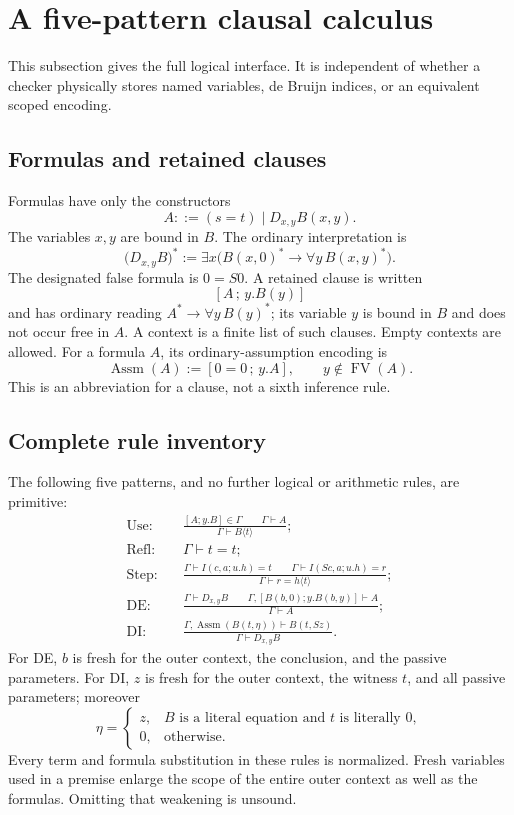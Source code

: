 \documentclass[11pt,letterpaper]{article}
\theoremstyle{definition}
\begin{document}
\section{A five-pattern clausal calculus}
\label{sec:five-pattern-clauses}

This subsection gives the full logical interface. It is independent of
whether a checker physically stores named variables, de Bruijn indices,
or an equivalent scoped encoding.

\subsection{Formulas and retained clauses}

Formulas have only the constructors
\[
 A ::= (s=t)\mid D_{x,y}B(x,y).
\]
The variables $x,y$ are bound in $B$. The ordinary interpretation is
\[
 \bigl(D_{x,y}B\bigr)^*
 :=\exists x\bigl(B(x,0)^*\to\forall y\,B(x,y)^*\bigr).
\]
The designated false formula is $0=S0$.
A retained clause is written
\[
 [A\,;\,y.B(y)]
\]
and has ordinary reading $A^*\to\forall y\,B(y)^*$; its variable $y$
is bound in $B$ and does not occur free in $A$. A context is a finite
list of such clauses. Empty contexts are allowed. For a formula $A$,
its ordinary-assumption encoding is
\[
 \operatorname{Assm}(A):=[0=0\,;\,y.A],\qquad y\notin\operatorname{FV}(A).
\]
This is an abbreviation for a clause, not a sixth inference rule.

\subsection{Complete rule inventory}

The following five patterns, and no further logical or arithmetic rules,
are primitive:
\begin{align*}
 \text{Use:}\quad&
 \frac{[A;y.B]\in\Gamma\qquad\Gamma\vdash A}
      {\Gamma\vdash B\langle t\rangle};\\[2mm]
 \text{Refl:}\quad&\Gamma\vdash t=t;\\[2mm]
 \text{Step:}\quad&
 \frac{\Gamma\vdash I(c,a;u.h)=t\qquad
       \Gamma\vdash I(Sc,a;u.h)=r}
      {\Gamma\vdash r=h\langle t\rangle};\\[2mm]
 \text{DE:}\quad&
 \frac{\Gamma\vdash D_{x,y}B\qquad
       \Gamma,[B(b,0);y.B(b,y)]\vdash A}
      {\Gamma\vdash A};\\[2mm]
 \text{DI:}\quad&
 \frac{\Gamma,\operatorname{Assm}(B(t,\eta))
          \vdash B(t,Sz)}
      {\Gamma\vdash D_{x,y}B}.
\end{align*}
For DE, $b$ is fresh for the outer context, the conclusion, and the
passive parameters. For DI, $z$ is fresh for the outer context, the
witness $t$, and all passive parameters; moreover
\[
 \eta=\begin{cases}
 z,& B\text{ is a literal equation and }t\text{ is literally }0,\\
 0,&\text{otherwise}.
 \end{cases}
\]
Every term and formula substitution in these rules is normalized.
Fresh variables used in a premise enlarge the scope of the entire outer
context as well as the formulas. Omitting that weakening is unsound.
\end{document}
